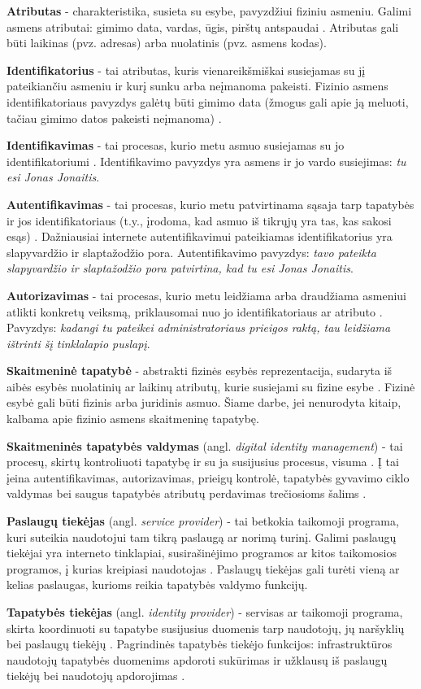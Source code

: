 \textbf{Atributas} - charakteristika, susieta su esybe, pavyzdžiui fiziniu asmeniu. Galimi asmens atributai: gimimo data,
vardas, ūgis, pirštų antspaudai \cite{Camp2004}. Atributas gali būti laikinas (pvz. adresas) arba nuolatinis (pvz. asmens kodas).

\textbf{Identifikatorius} - tai atributas, kuris vienareikšmiškai susiejamas su jį pateikiančiu asmeniu ir kurį
sunku arba neįmanoma pakeisti. Fizinio asmens identifikatoriaus pavyzdys galėtų būti gimimo data
(žmogus gali apie ją meluoti, tačiau gimimo datos pakeisti neįmanoma) \cite{Camp2004}.

\textbf{Identifikavimas} - tai procesas, kurio metu asmuo susiejamas su jo identifikatoriumi \cite{Camp2004}. Identifikavimo
pavyzdys yra asmens ir jo vardo susiejimas: \textit{tu esi Jonas Jonaitis}.

\textbf{Autentifikavimas} - tai procesas, kurio metu patvirtinama sąsaja tarp tapatybės ir jos identifikatoriaus (t.y., įrodoma,
kad asmuo iš tikrųjų yra tas, kas sakosi esąs) \cite{Camp2004, Strictest2011}. Dažniausiai internete autentifikavimui pateikiamas identifikatorius
yra slapyvardžio ir slaptažodžio pora. Autentifikavimo pavyzdys:
\textit{tavo pateikta slapyvardžio ir slaptažodžio pora patvirtina, kad tu esi Jonas Jonaitis}.

\textbf{Autorizavimas} - tai procesas, kurio metu leidžiama arba draudžiama asmeniui atlikti konkretų veiksmą, priklausomai
nuo jo identifikatoriaus ar atributo \cite{Camp2004}. Pavyzdys: \textit{kadangi tu pateikei administratoriaus
prieigos raktą, tau leidžiama ištrinti šį tinklalapio puslapį}. 

\textbf{Skaitmeninė tapatybė} - abstrakti fizinės esybės reprezentacija, sudaryta iš aibės esybės nuolatinių ar laikinų atributų,
kurie susiejami su fizine esybe \cite{Glasser2009, Camp2004}. Fizinė esybė gali būti fizinis arba juridinis asmuo.
Šiame darbe, jei nenurodyta kitaip, kalbama apie fizinio asmens skaitmeninę tapatybę.

\textbf{Skaitmeninės tapatybės valdymas} (angl. \textit{digital identity management}) - tai procesų, skirtų kontroliuoti
tapatybę ir su ja susijusius procesus, visuma \cite{Dabrowski2008}. Į tai įeina autentifikavimas, autorizavimas,
prieigų kontrolė, tapatybės gyvavimo ciklo
valdymas bei saugus tapatybės atributų perdavimas trečiosioms šalims \cite{Cao2010}.

\textbf{Paslaugų tiekėjas} (angl. \textit{service provider}) - tai betkokia taikomoji programa, kuri suteikia naudotojui tam tikrą paslaugą ar
norimą turinį. Galimi paslaugų tiekėjai yra interneto tinklapiai, susirašinėjimo programos ar kitos taikomosios programos,
į kurias kreipiasi naudotojas \cite{Pashalidis2003, Samar1999}. Paslaugų tiekėjas gali turėti vieną ar kelias paslaugas,
kurioms reikia tapatybės valdymo funkcijų.

\textbf{Tapatybės tiekėjas} (angl. \textit{identity provider}) - servisas ar taikomoji programa, skirta koordinuoti su tapatybe
susijusius duomenis tarp naudotojų, jų naršyklių bei paslaugų tiekėjų \cite{Strictest2011}. Pagrindinės tapatybės tiekėjo funkcijos:
infrastruktūros naudotojų tapatybės duomenims apdoroti sukūrimas ir užklausų iš paslaugų tiekėjų bei naudotojų apdorojimas \cite{Cao2010}.